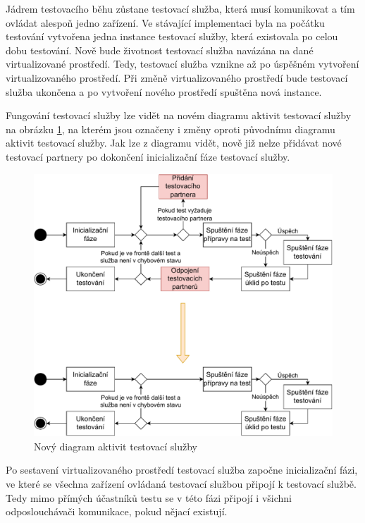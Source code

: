 Jádrem testovacího běhu zůstane testovací služba, která musí komunikovat a tím ovládat alespoň jedno zařízení. Ve stávající implementaci byla na počátku testování vytvořena jedna instance testovací služby, která existovala po celou dobu testování. Nově bude životnost testovací služba navázána na dané virtualizované prostředí. Tedy, testovací služba vznikne až po úspěšném vytvoření virtualizovaného prostředí. Při změně virtualizovaného prostředí bude testovací služba ukončena a po vytvoření nového prostředí spuštěna nová instance.

Fungování testovací služby lze vidět na novém diagramu aktivit testovací služby na obrázku \ref{fig:activitydiagramservice}, na kterém jsou označeny i změny oproti původnímu diagramu aktivit testovací služby. Jak lze z diagramu vidět, nově již nelze přidávat nové testovací partnery po dokončení inicializační fáze testovací služby.

\begin{figure}[htbp]
    \centering 
    \includegraphics[width=\textwidth]{assets/img/activitydiagramservicechange.pdf}
    \caption{Nový diagram aktivit testovací služby}
    \label{fig:activitydiagramservice}
\end{figure}

Po sestavení virtualizovaného prostředí testovací služba započne inicializační fázi, ve které se všechna zařízení ovládaná testovací službou připojí k testovací službě. Tedy mimo přímých účastníků testu se v této fázi připojí i všichni odposlouchávači komunikace, pokud nějací existují. 

